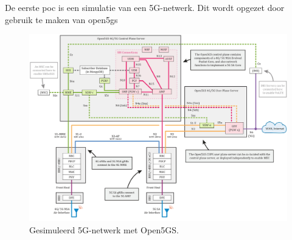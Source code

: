 \chapter{}%
\label{ch:poc1}

De eerste \gls{poc} is een simulatie van een 5G-netwerk. Dit wordt opgezet door gebruik te maken van \gls{open5gs}

\begin{figure}
    \includegraphics[width=\linewidth]{../graphics/Open5GS-Schema.jpg}
    \caption{Gesimuleerd 5G-netwerk met Open5GS. \autocite[Door][Copyright 2021 van \citeauthor{Lee2021}]{Lee2021}}
    \label{fig:open5gs-schema}
\end{figure}